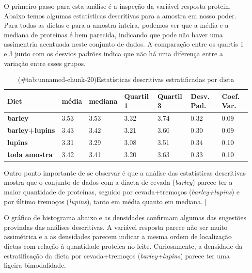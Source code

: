 \documentclass[
  11pt,
]{article}
\begin{document}
O primeiro passo para esta análise é a inspeção da variável resposta protein. Abaixo temos algumas estatísticas descritivas para a amostra em nosso poder. Para todas as dietas e para a amostra inteira, podemos ver que a média e a mediana de proteínas é bem parecida, indicando que pode não haver uma assimentria acentuada neste conjunto de dados. A comparação entre os quartis 1 e 3 junto com os desvios padrões indica que não há uma diferença entre a variação entre esses grupos.

\begin{table}

\caption{(\#tab:unnamed-chunk-20)Estatísticas descritivas estratificadas por dieta}
\centering
\fontsize{12}{14}\selectfont
\begin{tabu} to 
\toprule
Diet & média & mediana & Quartil 1 & Quartil 3 & Desv. Pad. & Coef. Var.\\
\midrule
\textbf{barley} & 3.53 & 3.53 & 3.32 & 3.74 & 0.32 & 0.09\\
\textbf{barley+lupins} & 3.43 & 3.42 & 3.21 & 3.60 & 0.30 & 0.09\\
\textbf{lupins} & 3.31 & 3.29 & 3.08 & 3.51 & 0.34 & 0.10\\
\textbf{toda amostra} & 3.42 & 3.41 & 3.20 & 3.63 & 0.33 & 0.10\\
\bottomrule
\end{tabu}
\end{table}

Outro ponto importante de se observar é que a análise das estatísticas descritivas mostra que o conjunto de dados com a diaeta de cevada (\emph{barley}) parece ter a maior quantidade de proteínas, seguido por cevada+tremoços (\emph{barley+lupins}) e por último tremoços (\emph{lupins}), tanto em média quanto em mediana. {[}

O gráfico de histograma abaixo e as densidades confirmam algumas das sugestões provindas das análises descritivas. A variável resposta parece não ser muito assimétrica e a as densidades parecem indicar a mesma ordem de localização dietas com relação à quantidade proteica no leite. Curiosamente, a densidade da estratificação da dieta por cevada+tremoços (\emph{barley+lupins}) parece ter uma ligeira bimodalidade.
\end{document}
